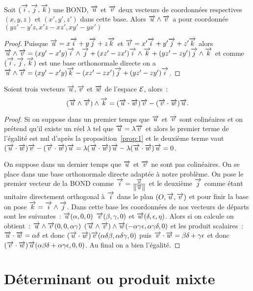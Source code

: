 \begin{prop}
  Soit \(\bondtrois\) une BOND, \(\vu\) et \(\vv\) deux vecteurs de coordonnées respectives \((x,y,z)\) et \((x',y',z')\) dans cette base. Alors \(\vu\wedge\vv\) a pour coordonnée \((yz'-y'z,x'z-xz',xy'-yx')\)
\end{prop}
\begin{proof}
  Puisque \(\vu=x\vi+y\vj+z\vk\) et \(\vv=x'\vi+y'\vj+z'\vk\) alors \(\vu\wedge\vv=(xy'-x'y)\vi\wedge\vj+(xz'-zx')\vi\wedge\vk+(yz'-zy')\vj\wedge\vk\) et comme \(\bondtrois\) est une base orthonormale directe on a \(\vu\wedge\vv=(xy'-x'y)\vk-(xz'-zx')\vj+(yz'-zy')\vi\).
\end{proof}
\begin{prop}
  Soient trois vecteurs \(\vu,\vv\) et \(\vw\) de l'espace \(\E\), alors~:
  \begin{equation}
    (\vu\wedge\vv)\wedge\vk=(\vu\cdot\vw)\vv-(\vv\cdot\vw)\vu.
  \end{equation}
\end{prop}
\begin{proof}
  Si on suppose dans un premier temps que \(\vu\) et \(\vv\) sont colinéaires et on prétend qu'il existe un réel \(\lambda\) tel que \(\vu=\lambda\vv\) et alors le premier terme de l'égalité est nul d'après la proposition~\ref{prop:1} et le deuxième terme vaut \((\vu\cdot\vw)\vv-(\vv\cdot\vw)\vu=\lambda(\vu\cdot\vw)\vu-\lambda(\vu\cdot\vw)\vu=0\).
  
  On suppose dans un dernier temps que \(\vu\) et \(\vv\) ne sont pas colinéaires. On se place dans une base orthonormale directe adaptée à notre problème. On pose le premier vecteur de la BOND comme \(\vi=\frac{\vu}{\norme{\vu}}\) et le deuxième \(\vj\) comme étant unitaire directement orthogonal à \(\vi\) dans le plan \((O,\vu,\vv)\) et pour finir la base on pose \(\vk=\vi\wedge\vj\). Dans cette base les coordonnées de nos vecteurs de départs sont les suivantes~: \(\vu(\alpha,0,0)\) \(\vv(\beta,\gamma,0)\) et \(\vw(\delta,\epsilon,\eta)\). Alors si on calcule on obtient~: \(\vu\wedge\vv(0,0,\alpha\gamma)\) \((\vu\wedge\vv)\wedge\vw(-\alpha\gamma\epsilon,\alpha\gamma\delta,0)\) et les produit scalaires~: \(\vu\cdot\vw=\alpha\delta\) et donc \((\vu\cdot\vw)\vv(\alpha\delta\beta, \alpha\delta\gamma,0)\) puis \(\vv\cdot\vw=\beta\delta+\gamma\epsilon\) et donc \((\vv\cdot\vw)\vu(\alpha\beta\delta+\alpha\gamma\epsilon,0,0)\). Au final on a bien l'égalité.
\end{proof}

\section{Déterminant ou produit mixte}
